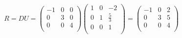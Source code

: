 \begin{enumerate}
		\begin{equation*}
			R=DU=\left(\begin{array}{ccc}
			-1 & 0 & 0\\
			0 & 3 & 0\\
			0 & 0 & 4\\
			\end{array}\right)
			\left(\begin{array}{ccc}
			1 & 0 & -2\\
			0 & 1 & \frac 5 3\\
			0 & 0 & 1\\
			\end{array}\right)
			=\left(\begin{array}{ccc}
			-1 & 0 & 2\\
			0 & 3 & 5\\
			0 & 0 & 4\\
			\end{array}\right)
		\end{equation*}
\end{enumerate}
\clearpage
